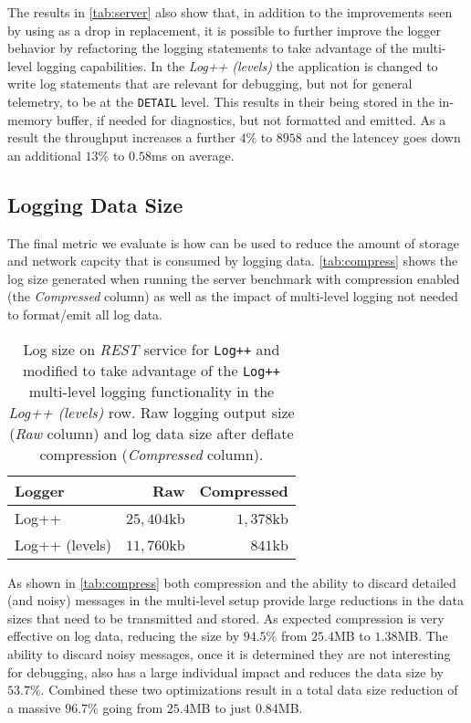 The results in \autoref{tab:server} also show that, in addition to the improvements 
seen by using \projn as a drop in replacement, it is possible to further improve the 
logger behavior by refactoring the logging statements to take advantage of the 
multi-level logging capabilities. In the \emph{Log++ (levels)} the application is 
changed to write log statements that are relevant for debugging, but not for general 
telemetry, to be at the \texttt{DETAIL} level. This results in their being stored in 
the in-memory buffer, if needed for diagnostics, but not formatted and emitted. As 
a result the throughput increases a further $4\%$ to $8958$ and the latencey goes 
down an additional $13\%$ to $0.58$ms on average.

\subsection{Logging Data Size}
The final metric we evaluate is how \projn can be used to reduce the amount of 
storage and network capcity that is consumed by logging data. \autoref{tab:compress} 
shows the log size generated when running the server benchmark with compression 
enabled (the \emph{Compressed} column) as well as the impact of multi-level 
logging not needed to format/emit all log data.

\begin{table}[t]  
    \centering
    {\small
    \begin{tabular}{l | r r }
    Logger        & Raw & Compressed \\
    \hline
    Log++          & $25,404$kb & $1,378$kb \\
    Log++ (levels) & $11,760$kb & $841$kb   \\
    \end{tabular}
    }
    \vspace{2mm}
    \caption{\small Log size on \emph{REST} service for \texttt{Log++}
    and modified to take advantage of the \texttt{Log++} 
    multi-level logging functionality in the \emph{Log++ (levels)} row. Raw 
    logging output size (\emph{Raw} column) and log data size after deflate 
    compression (\emph{Compressed} column).}
    \label{tab:compress}
\end{table}

As shown in \autoref{tab:compress} both compression and the ability to 
discard detailed (and noisy) messages in the multi-level setup provide 
large reductions in the data sizes that need to be transmitted and stored. 
As expected compression is very effective on log data, reducing the size 
by $94.5\%$ from $25.4$MB to $1.38$MB. The ability to discard noisy messages, 
once it is determined they are not interesting for debugging, also has a 
large individual impact and reduces the data size by $53.7\%$. Combined these 
two optimizations result in a total data size reduction of a massive $96.7\%$ 
going from $25.4$MB to just $0.84$MB.
